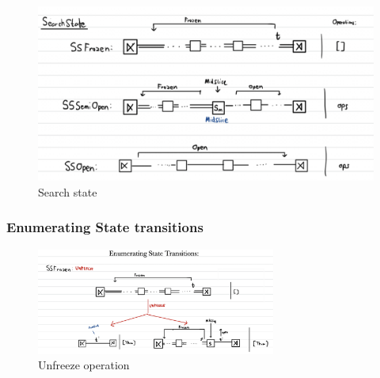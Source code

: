 \documentclass[12pt,a4paper,twoside,openright]{report}
\theoremstyle{definition}
\begin{document}
\begin{figure}[ht]
  \centering
  \includegraphics[width=\textwidth]{searchstate}
  \caption{Search state}
  \label{fig:searchstate}
\end{figure}
\par
\par

\FloatBarrier
\subsubsection{Enumerating State transitions}

\begin{figure}[ht]
  \centering
  \includegraphics[width=0.7\textwidth]{frozenenum}
  \caption{Unfreeze operation}
  \label{fig:frozenenum}
\end{figure}
\end{document}
